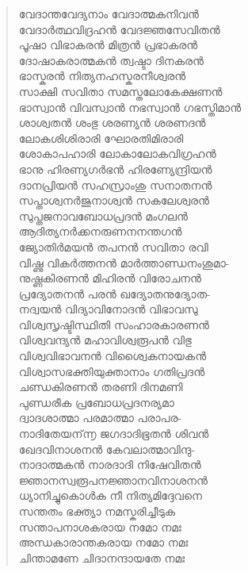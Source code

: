 \begin{verse}
വേദാന്തവേദ്യനാം വേദാത്മകനിവന്‍\\
വേദാര്‍ത്ഥവിദ്രഹന്‍ വേദജ്ഞസേവിതന്‍\\
പൂഷാ വിഭാകരന്‍ മിത്രന്‍ പ്രഭാകരന്‍\\
ദോഷാകരാത്മകന്‍ ത്വഷ്ടാ ദിനകരന്‍\\
ഭാസ്കരന്‍ നിത്യനഹസ്കരനീശ്വരന്‍\\
സാക്ഷി സവിതാ സമസ്തലോകേക്ഷണന്‍\\
ഭാസ്വാന്‍ വിവസ്വാന്‍ നഭസ്വാന്‍ ഗഭസ്തിമാന്‍\\
ശാശ്വതന്‍ ശംഭു ശരണ്യന്‍ ശരണദന്‍\\
ലോകശിശിരാരി ഘോരതിമിരാരി\\
ശോകാപഹാരി ലോകാലോകവിഗ്രഹന്‍\\
ഭാനു ഹിരണ്യഗര്‍ഭന്‍ ഹിരണ്യേന്ദ്രിയന്‍\\
ദാനപ്രിയന്‍ സഹസ്രാംശു സനാതനന്‍\\
സപ്താശ്വനര്‍ജുനാശ്വന്‍ സകലേശ്വരന്‍\\
സുപ്തജനാവബോധപ്രദന്‍ മംഗലന്‍\\
ആദിത്യനര്‍ക്കനരുണനനന്തഗന്‍\\
ജ്യോതിര്‍മയന്‍ തപനന്‍ സവിതാ രവി\\
വിഷ്ണു വികര്‍ത്തനന്‍ മാര്‍ത്താണ്ഡനംശുമാ-\\
നുഷ്ണകിരണന്‍ മിഹിരന്‍ വിരോചനന്‍\\
പ്രദ്യോതനന്‍ പരന്‍ ഖദ്യോതനുദ്യോത-\\
നദ്വയന്‍ വിദ്യാവിനോദന്‍ വിഭാവസു\\
വിശ്വസൃഷ്ടിസ്ഥിതി സംഹാരകാരണന്‍\\
വിശ്വവന്ദ്യന്‍ മഹാവിശ്വരൂപന്‍ വിഭു\\
വിശ്വവിഭാവനന്‍ വിശ്വൈകനായകന്‍\\
വിശ്വാസഭക്തിയുക്താനാം ഗതിപ്രദന്‍\\
ചണ്ഡകിരണന്‍ തരണി ദിനമണി\\
പുണ്ഡരീക പ്രബോധപ്രദനര്യമാ\\
ദ്വാദശാത്മാ പരമാത്മാ പരാപര-\\
നാദിതേയന്൬ ജഗദാദിഭൂതന്‍ ശിവന്‍\\
ഖേദവിനാശനന്‍ കേവലാത്മാവിന്ദു-\\
നാദാത്മകന്‍ നാരദാദി നിഷേവിതന്‍\\
ജ്ഞാനസ്വരൂപനജ്ഞാനവിനാശനന്‍\\
ധ്യാനിച്ചുകൊള്‍ക നീ നിത്യമിദ്ദേവനെ\\
സന്തതം ഭക്ത്യാ നമസ്കരിച്ചീടുക\\
സന്താപനാശകരായ നമോ നമഃ\\
അന്ധകാരാന്തകരായ നമോ നമഃ\\
ചിന്താമണേ ചിദാനന്ദായതേ നമഃ\\

\end{verse}
